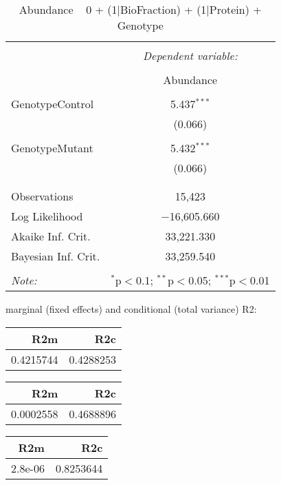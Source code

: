 \documentclass[11pt]{report}
\begin{document}
\begin{table}[!htbp] \centering 
  \caption{Abundance ~ 0 + (1|BioFraction) + (1|Protein) + Genotype} 
  \label{} 
\begin{tabular}{@{\extracolsep{5pt}}lc} 
\\[-1.8ex]\hline 
\hline \\[-1.8ex] 
 & \multicolumn{1}{c}{\textit{Dependent variable:}} \\ 
\cline{2-2} 
\\[-1.8ex] & Abundance \\ 
\hline \\[-1.8ex] 
 GenotypeControl & 5.437$^{***}$ \\ 
  & (0.066) \\ 
  & \\ 
 GenotypeMutant & 5.432$^{***}$ \\ 
  & (0.066) \\ 
  & \\ 
\hline \\[-1.8ex] 
Observations & 15,423 \\ 
Log Likelihood & $-$16,605.660 \\ 
Akaike Inf. Crit. & 33,221.330 \\ 
Bayesian Inf. Crit. & 33,259.540 \\ 
\hline 
\hline \\[-1.8ex] 
\textit{Note:}  & \multicolumn{1}{r}{$^{*}$p$<$0.1; $^{**}$p$<$0.05; $^{***}$p$<$0.01} \\ 
\end{tabular} 
\end{table} 
marginal (fixed effects) and conditional (total variance) R2:

\begin{tabular}{r|r}
\hline
R2m & R2c\\
\hline
0.4215744 & 0.4288253\\
\hline
\end{tabular}

\begin{tabular}{r|r}
\hline
R2m & R2c\\
\hline
0.0002558 & 0.4688896\\
\hline
\end{tabular}

\begin{tabular}{r|r}
\hline
R2m & R2c\\
\hline
2.8e-06 & 0.8253644\\
\hline
\end{tabular}
\end{document}
